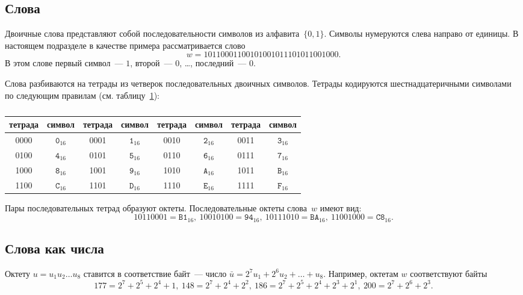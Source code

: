 \subsection{Слова}

Двоичные слова представляют собой последовательности символов из 
алфавита~$\{0,1\}$. Символы нумеруются слева направо от единицы.
%
В настоящем подразделе в качестве примера рассматривается слово
$$
w=1011 0001 1001 0100 1011 1010 1100 1000.
$$
В этом слове первый символ~--- $1$, 
второй~--- $0$, \ldots, последний~--- $0$.

Слова разбиваются на тетрады из четверок последовательных двоичных символов.
%
Тетрады кодируются шестнадцатеричными символами по следующим правилам
(см. таблицу~\ref{Table.Hex}):

\begin{table}[H]
\caption{}\label{Table.Hex}
\begin{tabular}{|c|c||c|c||c|c||c|c|}
\hline
тетрада & символ & тетрада & символ & тетрада & символ & тетрада & символ\\
\hline
\hline
0000 & $\texttt{0}_{16}$ & 0001 & $\texttt{1}_{16}$ & 
0010 & $\texttt{2}_{16}$ & 0011 & $\texttt{3}_{16}$\\
0100 & $\texttt{4}_{16}$ & 0101 & $\texttt{5}_{16}$ & 
0110 & $\texttt{6}_{16}$ & 0111 & $\texttt{7}_{16}$\\ 
1000 & $\texttt{8}_{16}$ & 1001 & $\texttt{9}_{16}$ & 
1010 & $\texttt{A}_{16}$ & 1011 & $\texttt{B}_{16}$\\ 
1100 & $\texttt{C}_{16}$ & 1101 & $\texttt{D}_{16}$ & 
1110 & $\texttt{E}_{16}$ & 1111 & $\texttt{F}_{16}$\\ 
\hline
\end{tabular}
\end{table}

Пары последовательных тетрад образуют октеты.
Последовательные октеты слова~$w$ имеют вид:
$$
1011 0001=\texttt{B1}_{16},\ 
1001 0100=\texttt{94}_{16},\ 
1011 1010=\texttt{BA}_{16},\  
1100 1000=\texttt{C8}_{16}.
$$

\subsection{Слова как числа}

Октету $u=u_1 u_2\ldots u_8$ ставится в соответствие байт~--- 
число $\bar{u}=2^7u_1+2^6 u_2+\ldots + u_8$. 
Например, октетам $w$ соответствуют байты
$$
177=2^7+2^5+2^4+1,\ 
148=2^7+2^4+2^2,\ 
186=2^7+2^5+2^4+2^3+2^1,\ 
200=2^7+2^6+2^3.
$$

